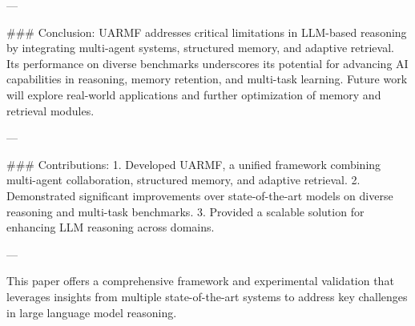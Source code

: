 ---

### Conclusion:
UARMF addresses critical limitations in LLM-based reasoning by integrating multi-agent systems, structured memory, and adaptive retrieval. Its performance on diverse benchmarks underscores its potential for advancing AI capabilities in reasoning, memory retention, and multi-task learning. Future work will explore real-world applications and further optimization of memory and retrieval modules.

---

### Contributions:
1. Developed UARMF, a unified framework combining multi-agent collaboration, structured memory, and adaptive retrieval.
2. Demonstrated significant improvements over state-of-the-art models on diverse reasoning and multi-task benchmarks.
3. Provided a scalable solution for enhancing LLM reasoning across domains.

--- 

This paper offers a comprehensive framework and experimental validation that leverages insights from multiple state-of-the-art systems to address key challenges in large language model reasoning.